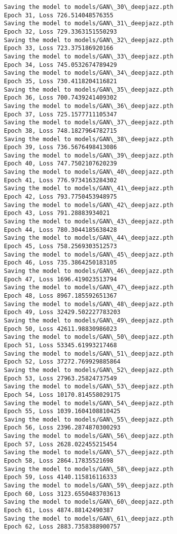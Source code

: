 \documentclass[11pt]{article}
\begin{document}
\begin{Verbatim}[commandchars=\\\{\}]
Saving the model to models/GAN\_30\_deepjazz.pth
Epoch 31, Loss 726.514048576355
Saving the model to models/GAN\_31\_deepjazz.pth
Epoch 32, Loss 729.3363151550293
Saving the model to models/GAN\_32\_deepjazz.pth
Epoch 33, Loss 723.375186920166
Saving the model to models/GAN\_33\_deepjazz.pth
Epoch 34, Loss 745.0532674789429
Saving the model to models/GAN\_34\_deepjazz.pth
Epoch 35, Loss 730.4118204116821
Saving the model to models/GAN\_35\_deepjazz.pth
Epoch 36, Loss 700.7439241409302
Saving the model to models/GAN\_36\_deepjazz.pth
Epoch 37, Loss 725.1577711105347
Saving the model to models/GAN\_37\_deepjazz.pth
Epoch 38, Loss 748.1827964782715
Saving the model to models/GAN\_38\_deepjazz.pth
Epoch 39, Loss 736.5676498413086
Saving the model to models/GAN\_39\_deepjazz.pth
Epoch 40, Loss 747.7502107620239
Saving the model to models/GAN\_40\_deepjazz.pth
Epoch 41, Loss 776.9734163284302
Saving the model to models/GAN\_41\_deepjazz.pth
Epoch 42, Loss 793.7750453948975
Saving the model to models/GAN\_42\_deepjazz.pth
Epoch 43, Loss 791.28883934021
Saving the model to models/GAN\_43\_deepjazz.pth
Epoch 44, Loss 780.3044185638428
Saving the model to models/GAN\_44\_deepjazz.pth
Epoch 45, Loss 758.2569303512573
Saving the model to models/GAN\_45\_deepjazz.pth
Epoch 46, Loss 735.3864250183105
Saving the model to models/GAN\_46\_deepjazz.pth
Epoch 47, Loss 1696.419023513794
Saving the model to models/GAN\_47\_deepjazz.pth
Epoch 48, Loss 8967.185592651367
Saving the model to models/GAN\_48\_deepjazz.pth
Epoch 49, Loss 32429.502227783203
Saving the model to models/GAN\_49\_deepjazz.pth
Epoch 50, Loss 42611.98830986023
Saving the model to models/GAN\_50\_deepjazz.pth
Epoch 51, Loss 53345.61993217468
Saving the model to models/GAN\_51\_deepjazz.pth
Epoch 52, Loss 37272.769929885864
Saving the model to models/GAN\_52\_deepjazz.pth
Epoch 53, Loss 27963.25824737549
Saving the model to models/GAN\_53\_deepjazz.pth
Epoch 54, Loss 10170.814558029175
Saving the model to models/GAN\_54\_deepjazz.pth
Epoch 55, Loss 1039.1604108810425
Saving the model to models/GAN\_55\_deepjazz.pth
Epoch 56, Loss 2396.2874870300293
Saving the model to models/GAN\_56\_deepjazz.pth
Epoch 57, Loss 2628.022455215454
Saving the model to models/GAN\_57\_deepjazz.pth
Epoch 58, Loss 2864.17835521698
Saving the model to models/GAN\_58\_deepjazz.pth
Epoch 59, Loss 4140.115816116333
Saving the model to models/GAN\_59\_deepjazz.pth
Epoch 60, Loss 3123.6550483703613
Saving the model to models/GAN\_60\_deepjazz.pth
Epoch 61, Loss 4874.88142490387
Saving the model to models/GAN\_61\_deepjazz.pth
Epoch 62, Loss 2883.7358388900757

\end{Verbatim}
\end{document}

